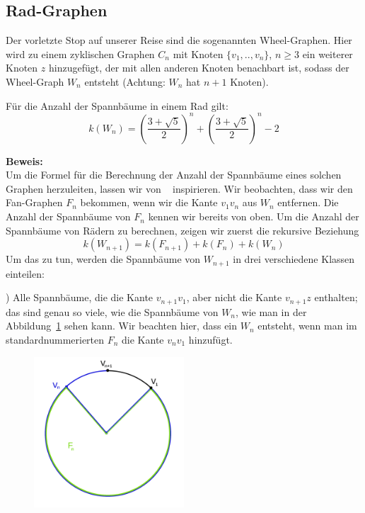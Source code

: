 \subsection{Rad-Graphen}
Der vorletzte Stop auf unserer Reise sind die sogenannten Wheel-Graphen. Hier wird zu einem zyklischen Graphen $C_n$ mit Knoten $\{v_1,..,v_n\}$, $n \geq 3$ ein weiterer Knoten $z$ hinzugefügt, der mit allen anderen Knoten benachbart ist, sodass der Wheel-Graph $W_{n}$ entsteht (Achtung: $W_n$ hat $n+1$ Knoten).
\begin{Tm}
Für die Anzahl der Spannbäume in einem Rad gilt:
\begin{equation}
 \mathit{k}(W_n) = (\frac{3+\sqrt{5}}{2})^n+(\frac{3+\sqrt{5}}{2})^n-2
 \label{wn}
\end{equation}
\end{Tm}
\textbf{Beweis:}\\
Um die Formel für die Berechnung der Anzahl der Spannbäume eines solchen Graphen herzuleiten, lassen wir von ~\cite{sedlacek_1970} inspirieren.
Wir beobachten, dass wir den Fan-Graphen $F_n$ bekommen, wenn wir die Kante $v_1v_n$ aus $W_n$ entfernen.
Die Anzahl der Spannbäume von $F_n$ kennen wir bereits von oben.
Um die Anzahl der Spannbäume von Rädern zu berechnen, zeigen wir zuerst die rekursive Beziehung
\begin{equation}
 \mathit{k}(W_{n+1}) = \mathit{k}(F_{n+1}) + \mathit{k}(F_n) + \mathit{k}(W_n)
\end{equation}
Um das zu tun, werden die Spannbäume von $W_{n+1}$ in drei verschiedene Klassen einteilen:\\
\par %
\begingroup
\leftskip=20pt%
\rightskip=20pt
) Alle Spannbäume, die die Kante $v_{n+1}v_1$, aber nicht die Kante $v_{n+1}z$ enthalten; das sind genau so viele, wie die Spannbäume von $W_n$, wie man in der Abbildung~\ref{klasse1} sehen kann. Wir beachten hier, dass ein $W_n$ entsteht, wenn man im standardnummerierten $F_n$ die Kante $v_{n}v_1$ hinzufügt.
\begin{figure}[H]
  \centering
 \includegraphics[width=0.5\textwidth]{klasse1.png}
 \label{klasse1} %
\end{figure}
